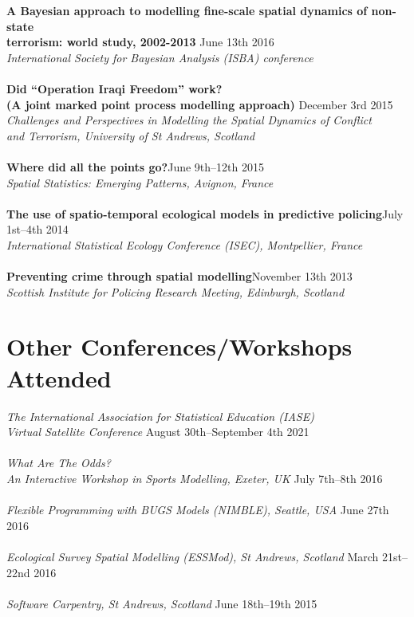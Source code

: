 \documentclass[10pt,letter]{article}
\begin{document}
{\textbf {A Bayesian approach to modelling fine-scale spatial dynamics of non-state\\
 terrorism: world study, 2002-2013 }}\hfill June 13th 2016\\
 {\sl International Society for Bayesian Analysis (ISBA) conference}\\
 \hdashrule[0.5ex]{4cm}{1pt}{1pt}\\
 {\textbf{Did ``Operation Iraqi Freedom'' work? \\
(A joint marked point process modelling approach) }}\hfill December 3rd 2015\\
 {\sl Challenges and Perspectives in Modelling the Spatial Dynamics of Conflict\\ and Terrorism, University of St Andrews, Scotland}\\
 \hdashrule[0.5ex]{4cm}{1pt}{1pt}\\
{\textbf{Where did all the points go?}}\hfill June 9th--12th 2015\\
 {\sl Spatial Statistics: Emerging Patterns, Avignon, France}\\
\hdashrule[0.5ex]{4cm}{1pt}{1pt}\\
 {\textbf{The use of spatio-temporal ecological models in predictive policing}}\hfill July 1st--4th 2014\\
 {\sl International Statistical Ecology Conference (ISEC), Montpellier, France}\\
 \hdashrule[0.5ex]{4cm}{1pt}{1pt}\\
{\textbf{Preventing crime through spatial modelling}}\hfill November 13th 2013\\
 {\sl Scottish Institute for Policing Research Meeting, Edinburgh, Scotland}\\

  
\section*{Other Conferences/Workshops Attended}
\vspace{1mm}
{\sl The International Association for Statistical Education (IASE) \\ Virtual Satellite Conference} \hfill August 30th--September 4th 2021\\
\hdashrule[0.5ex]{4cm}{1pt}{1pt}\\
{\sl What Are The Odds? \\ An Interactive Workshop in Sports Modelling, Exeter, UK} \hfill July 7th--8th 2016\\
\hdashrule[0.5ex]{4cm}{1pt}{1pt}\\
{\sl Flexible Programming with BUGS Models (NIMBLE), Seattle, USA} \hfill June 27th 2016\\
\hdashrule[0.5ex]{4cm}{1pt}{1pt}\\
{\sl Ecological Survey Spatial Modelling (ESSMod), St Andrews, Scotland} \hfill March 21st--22nd 2016\\
 \hdashrule[0.5ex]{4cm}{1pt}{1pt}\\
 {\sl Software Carpentry, St Andrews, Scotland} \hfill June 18th--19th 2015\\
 \newpage
\end{document}
